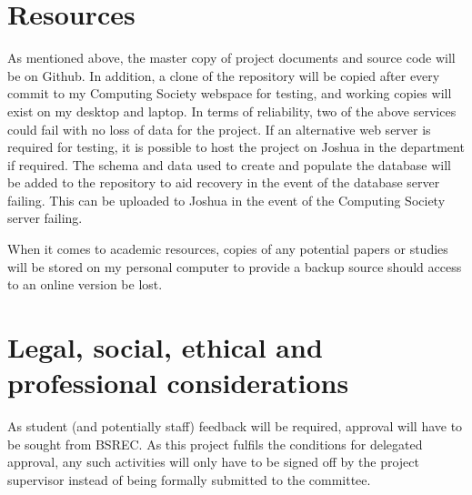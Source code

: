 \documentclass{report}
\begin{document}
\section*{Resources}
As mentioned above, the master copy of project documents and source code will be on Github. In addition, a clone of the repository will be copied after every commit to my Computing Society webspace for testing, and working copies will exist on my desktop and laptop. In terms of reliability, two of the above services could fail with no loss of data for the project. If an alternative web server is required for testing, it is possible to host the project on Joshua in the department if required. The schema and data used to create and populate the database will be added to the repository to aid recovery in the event of the database server failing. This can be uploaded to Joshua in the event of the Computing Society server failing.

When it comes to academic resources, copies of any potential papers or studies will be stored on my personal computer to provide a backup source should access to an online version be lost.
\section*{Legal, social, ethical and professional considerations}
As student (and potentially staff) feedback will be required, approval will have to be sought from BSREC. As this project fulfils the conditions for delegated approval, any such activities will only have to be signed off by the project supervisor instead of being formally submitted to the committee.
\end{document}
